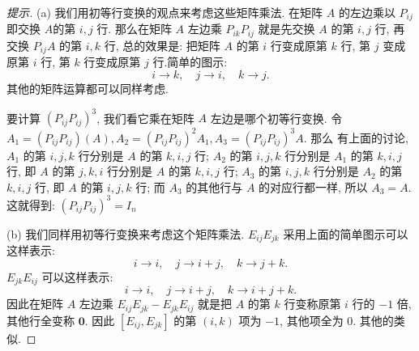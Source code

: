 \documentclass[UTF8]{ctexart}
\begin{document}
\begin{proof}[提示]
	(a) 我们用初等行变换的观点来考虑这些矩阵乘法. 在矩阵 $A$ 的左边乘以 $P_{ij}$ 即交换 $A$的第 $i,j$ 行.  那么在矩阵 $A$ 左边乘 $P_{ik}P_{ij}$ 就是先交换 $A$ 的第 $i,j$ 行, 再交换 $P_{ij}A$ 的第 $i,k$ 行, 总的效果是: 把矩阵 $A$ 的第 $i$ 行变成原第 $k$ 行, 第 $j$ 变成原第 $i$ 行, 第 $k$ 行变成原第 $j$ 行.简单的图示:
	$$i\to k,\quad j\to i,\quad k\to j.$$
	其他的矩阵运算都可以同样考虑.
	
	要计算 $(P_{ij}P_{ij})^3$, 我们看它乘在矩阵 $A$ 左边是哪个初等行变换. 令 $A_1=(P_{ij}P_{ij})(A),A_2=(P_{ij}P_{ij})^2A_1,A_3=(P_{ij}P_{ij})^3 A$. 那么 有上面的讨论, $A_1$ 的第 $i,j,k$ 行分别是 $A$ 的第 $k,i,j$ 行; $A_2$ 的第 $i,j,k$ 行分别是 $A_1$ 的第 $k,i,j$ 行, 即 $A$ 的第 $j,k,i$ 行分别是 $A$ 的第 $k,i,j$ 行; $A_3$ 的第 $i,j,k$ 行分别是 $A_2$ 的第 $k,i,j$ 行, 即 $A$ 的第 $i,j,k$ 行; 而 $A_3$ 的其他行与 $A$ 的对应行都一样, 所以 $A_3=A$. 这就得到: $(P_{ij}P_{ij})^3=I_n$
	
	(b) 我们同样用初等行变换来考虑这个矩阵乘法. $E_{ij}E_{jk}$ 采用上面的简单图示可以这样表示:
	$$i\to i,\quad j\to i+j,\quad k\to j+k.$$
	$E_{jk}E_{ij}$ 可以这样表示:
	$$i\to i,\quad j\to i+j,\quad k\to i+j+k.$$
	因此在矩阵 $A$ 左边乘 $E_{ij}E_{jk}-E_{jk}E_{ij}$ 就是把 $A$ 的第 $k$ 行变称原第 $i$ 行的 $-1$ 倍, 其他行全变称 $\bm{0}$. 因此 $[E_{ij},E_{jk}]$ 的第 $(i,k)$ 项为 $-1$, 其他项全为 $0$. 其他的类似.
	\end{proof}
\end{document}
